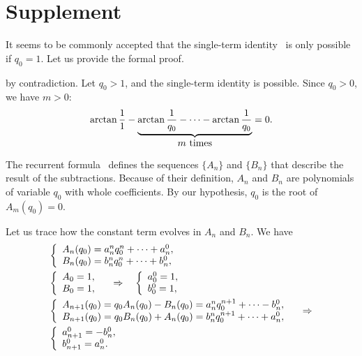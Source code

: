 \documentclass[draft, 10pt]{article} %
\def\fact#1{Fact~\ref{#1}}
\begin{document}
\section{Supplement}

\noindent{\bf \fact{nosingle}.\/} It seems to be commonly accepted that
the single-term identity~ is only possible if $q_0=1$.
Let us provide the formal proof.

 by contradiction. Let $q_0>1$, and the single-term identity is possible.
Since $q_0>0$, we have $m>0$:
$$
\arctan \dfrac{1}{1} - \underbrace{\arctan \dfrac{1}{q_0} - \dots - \arctan \dfrac{1}{q_0}}_{\hbox{$m$ times}} = 0.
$$

The recurrent formula~ defines the sequences $\{ A_n \}$ and $\{ B_n \}$ that
describe the result of the subtractions.
Because of their definition, $A_n$ and $B_n$ are polynomials of variable $q_0$
with whole coefficients. By our hypothesis, $q_0$ is the root of $A_m(q_0)=0$.

Let us trace how the constant term evolves in $A_n$ and $B_n$.
We have
$$
\begin{array}{l}
%
\left\{\begin{array}{l}
A_n(q_0) = a_n^n q_0^n + \dots + a_n^0, \\
B_n(q_0) = b_n^n q_0^n + \dots + b_n^0,
\end{array}\right. \\[1em]
%
\left\{\begin{array}{l}
A_0=1, \\
B_0=1,
\end{array}\right.
\quad\ergo\quad
\left\{\begin{array}{l}
a_0^0 = 1, \\
b_0^0 = 1,
\end{array}\right. \\[1em]
%
\left\{\begin{array}{l}
A_{n+1}(q_0) = q_0 A_n(q_0) - B_n(q_0) = a_n^n q_0^{n+1} + \dots - b_n^0, \\
B_{n+1}(q_0) = q_0 B_n(q_0) + A_n(q_0) = b_n^n q_0^{n+1} + \dots + a_n^0,
\end{array}\right.  \quad\ergo \\[1em]
%
\left\{\begin{array}{l}
a_{n+1}^0 = - b_n^0, \\
b_{n+1}^0 = a_n^0.
\end{array}\right.
%
\end{array}
$$
\end{document}
